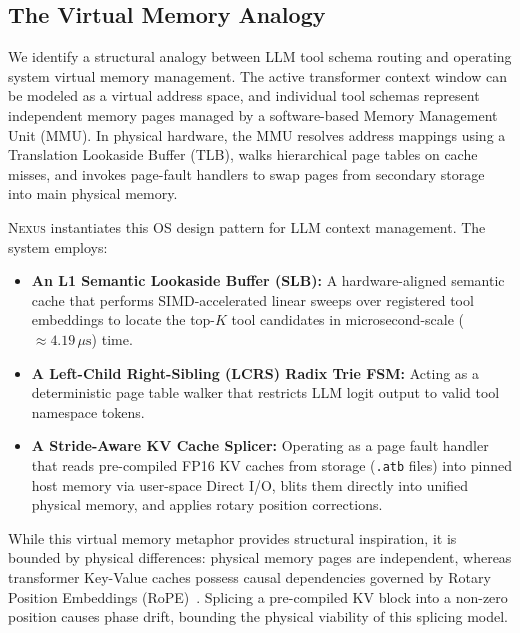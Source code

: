 \subsection{The Virtual Memory Analogy}
We identify a structural analogy between LLM tool schema routing and operating system virtual memory management. The active transformer context window can be modeled as a virtual address space, and individual tool schemas represent independent memory pages managed by a software-based Memory Management Unit (MMU). In physical hardware, the MMU resolves address mappings using a Translation Lookaside Buffer (TLB), walks hierarchical page tables on cache misses, and invokes page-fault handlers to swap pages from secondary storage into main physical memory.

\textsc{Nexus} instantiates this OS design pattern for LLM context management. The system employs:
\begin{itemize}
  \item \textbf{An L1 Semantic Lookaside Buffer (SLB):} A hardware-aligned semantic cache that performs SIMD-accelerated linear sweeps over registered tool embeddings to locate the top-$K$ tool candidates in microsecond-scale ($\approx 4.19\,\mu\text{s}$) time.
  \item \textbf{A Left-Child Right-Sibling (LCRS) Radix Trie FSM:} Acting as a deterministic page table walker that restricts LLM logit output to valid tool namespace tokens.
  \item \textbf{A Stride-Aware KV Cache Splicer:} Operating as a page fault handler that reads pre-compiled FP16 KV caches from storage (\texttt{.atb} files) into pinned host memory via user-space Direct I/O, blits them directly into unified physical memory, and applies rotary position corrections.
\end{itemize}

While this virtual memory metaphor provides structural inspiration, it is bounded by physical differences: physical memory pages are independent, whereas transformer Key-Value caches possess causal dependencies governed by Rotary Position Embeddings (RoPE)~\cite{peng2023yarn}. Splicing a pre-compiled KV block into a non-zero position causes phase drift, bounding the physical viability of this splicing model.

